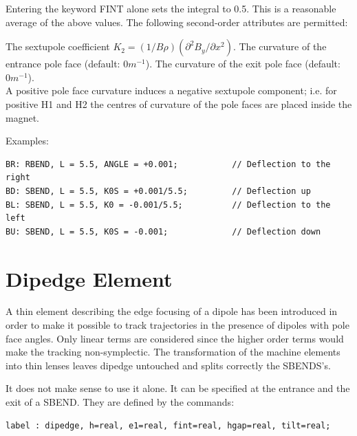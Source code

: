 Entering the keyword FINT alone sets the integral to 0.5. This is a
reasonable average of the above values.  The following second-order
attributes are permitted:  
\begin{madlist}
     The sextupole coefficient 
    $K_2 = (1 / B \rho) (\partial^2 B_y / \partial x^2)$.   
     The curvature of the entrance pole face 
    (default: $0 m^{-1}$).  
     The curvature of the exit pole face 
    (default: $0 m^{-1}$). \\ 
    A positive pole face curvature induces a negative sextupole
    component; i.e. for positive H1 and H2 the centres of curvature of
    the pole faces are placed inside the magnet. 
\end{madlist} 

Examples: 
\begin{verbatim}
BR: RBEND, L = 5.5, ANGLE = +0.001;           // Deflection to the right
BD: SBEND, L = 5.5, K0S = +0.001/5.5;         // Deflection up
BL: SBEND, L = 5.5, K0 = -0.001/5.5;          // Deflection to the left
BU: SBEND, L = 5.5, K0S = -0.001;             // Deflection down
\end{verbatim}


%
\section{Dipedge Element}
A thin element describing the edge focusing of a dipole has been
introduced in order to make it possible to track trajectories in the
presence of dipoles with pole face angles. Only linear terms are
considered since the higher order terms would make the tracking
non-symplectic. The transformation of the machine elements into thin
lenses leaves dipedge untouched and splits correctly the SBENDS's.  

It does not make sense to use it alone. It can be specified at the
entrance and the exit of a SBEND. They are defined by the commands:  
\begin{verbatim}
label : dipedge, h=real, e1=real, fint=real, hgap=real, tilt=real;
\end{verbatim} 

